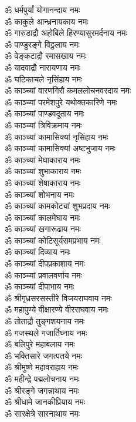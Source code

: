 \begin{multicols}{2}
\begin{flushleft}
ॐ धर्मपुर्यां योगानन्दाय नमः\\
ॐ काकुले आन्ध्रनायकाय नमः\\
ॐ गारुडाद्रौ अहोबिले हिरण्यासुरमर्दनाय नमः\\
ॐ पाण्डुरङ्गे विट्ठलाय नमः\\
ॐ वेङ्कटाद्रौ रमासखाय नमः\hfill{}\\
ॐ यादवाद्रौ नारायणाय नमः\\
ॐ घटिकाचले नृसिंहाय नमः\\
ॐ काञ्च्यां वारणगिरौ कमललोचनवरदाय नमः\\
ॐ काञ्च्यां परमेशपुरे यथोक्तकारिणे नमः\\
ॐ काञ्च्यां पाण्डवदूताय नमः\\
ॐ काञ्च्यां त्रिविक्रमाय नमः\\
ॐ काञ्च्यां कामासिक्यां नृसिंहाय नमः\\
ॐ काञ्च्यां कामासिक्यां अष्टभुजाय नमः\\
ॐ काञ्च्यां मेघाकाराय नमः\\
ॐ काञ्च्यां शुभाकाराय नमः\hfill{}\\
ॐ काञ्च्यां शेषाकाराय नमः\\
ॐ काञ्च्यां शोभनाय नमः\\
ॐ काञ्च्यां कामकोट्यां शुभप्रदाय नमः\\
ॐ काञ्च्यां कालमेघाय नमः\\
ॐ काञ्च्यां खगारूढाय नमः\\
ॐ काञ्च्यां कोटिसूर्यसमप्रभाय नमः\\
ॐ काञ्च्यां दिव्याय नमः\\
ॐ काञ्च्यां दीपप्रकाशाय नमः\\
ॐ काञ्च्यां प्रवालवर्णाय नमः\\
ॐ काञ्च्यां दीपाभाय नमः\hfill{}\\
ॐ श्रीगृध्रसरसस्तीरे विजयराघवाय नमः\\
ॐ महापुण्ये वीक्षारण्ये वीरराघवाय नमः\\
ॐ तोताद्रौ तुङ्गशयनाय नमः\\
ॐ गजस्थले गजार्तिघ्नाय नमः\\
ॐ बलिपुरे महाबलाय नमः\\
ॐ भक्तिसारे जगत्पतये नमः\\
ॐ श्रीमुष्णे महावराहाय नमः\\
ॐ महीन्द्रे पद्मलोचनाय नमः\\
ॐ श्रीरङ्गे जगन्नाथाय नमः\\
ॐ श्रीधामे जानकीप्रियाय नमः\hfill{}\\
ॐ सारक्षेत्रे सारनाथाय नमः\\

\end{flushleft}
\end{multicols}

